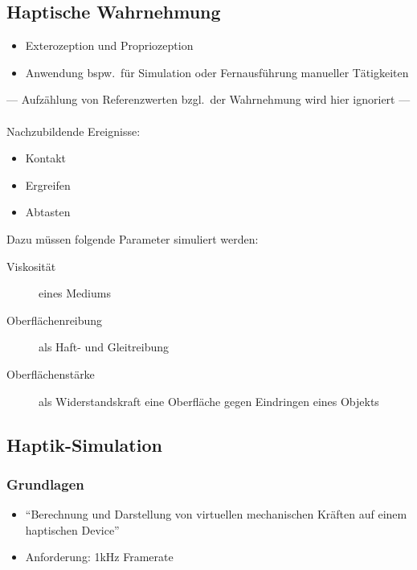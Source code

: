 \documentclass[a4paper, 12pt]{article}
\begin{document}
\subsection[Wahrnehmung]{Haptische Wahrnehmung}
\begin{itemize}
  \item Exterozeption und Propriozeption
  \item Anwendung bspw.\ für Simulation oder Fernausführung manueller Tätigkeiten
\end{itemize}
--- Aufzählung von Referenzwerten bzgl.\ der Wahrnehmung wird hier ignoriert ---\\\\
Nachzubildende Ereignisse:
\begin{itemize}
  \item Kontakt
  \item Ergreifen
  \item Abtasten
\end{itemize}
Dazu müssen folgende Parameter simuliert werden:
\begin{description}
  \item[Viskosität] eines Mediums
  \item[Oberflächenreibung] als Haft- und Gleitreibung
  \item[Oberflächenstärke] als Widerstandskraft eine Oberfläche gegen Eindringen eines Objekts
\end{description}


\subsection[Simulation]{Haptik-Simulation}

\subsubsection*{Grundlagen}

\begin{itemize}
  \item ``Berechnung und Darstellung von virtuellen mechanischen Kräften auf einem haptischen Device''
  \item Anforderung: 1kHz Framerate
\end{itemize}
\end{document}
